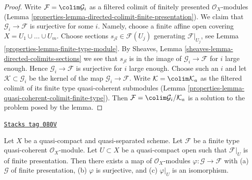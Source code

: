 \begin{proof}

Write $\mathcal{F} = \colim \mathcal{G}_i$ as a filtered colimit of
finitely presented $\mathcal{O}_X$-modules
(Lemma \ref{properties-lemma-directed-colimit-finite-presentation}).
We claim that $\mathcal{G}_i \to \mathcal{F}$ is surjective for some $i$.
Namely, choose a finite affine open covering $X = U_1 \cup \ldots \cup U_m$.
Choose sections $s_{jl} \in \mathcal{F}(U_j)$ generating
$\mathcal{F}|_{U_j}$, see Lemma \ref{properties-lemma-finite-type-module}.
By Sheaves, Lemma \ref{sheaves-lemma-directed-colimits-sections}
we see that $s_{jl}$ is in the image of $\mathcal{G}_i \to \mathcal{F}$
for $i$ large enough. Hence $\mathcal{G}_i \to \mathcal{F}$ is surjective
for $i$ large enough. Choose such an $i$ and let
$\mathcal{K} \subset \mathcal{G}_i$ be the kernel of the map
$\mathcal{G}_i \to \mathcal{F}$. Write $\mathcal{K} = \colim \mathcal{K}_a$
as the filtered colimit of its finite type quasi-coherent submodules
(Lemma \ref{properties-lemma-quasi-coherent-colimit-finite-type}). Then
$\mathcal{F} = \colim \mathcal{G}_i/\mathcal{K}_a$ is a solution
to the problem posed by the lemma.
\end{proof}

\begin{lemma}
\label{properties-lemma-application-directed-colimit}
\href{https://stacks.math.columbia.edu/tag/080V}{\texttt{Stacks tag 080V}}

Let $X$ be a quasi-compact and quasi-separated scheme.
Let $\mathcal{F}$ be a finite type quasi-coherent $\mathcal{O}_X$-module.
Let $U \subset X$ be a quasi-compact open such that $\mathcal{F}|_U$
is of finite presentation. Then there exists a map of $\mathcal{O}_X$-modules
$\varphi : \mathcal{G} \to \mathcal{F}$ with
(a) $\mathcal{G}$ of finite presentation,
(b) $\varphi$ is surjective, and
(c) $\varphi|_U$ is an isomorphism.
\end{lemma}

